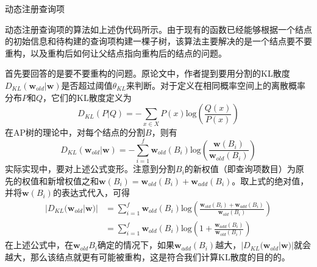 \documentclass[UTF8]{ctexart}
\begin{document}
\begin{spacing}{1.0}
\begin{algorithm}[H]
\caption{动态注册查询项}
\LinesNumbered
{}
\end{algorithm}
\end{spacing}

动态注册查询项的算法如上述伪代码所示。由于现有的函数已经能够根据一个结点的初始信息和待构建的查询项构建一棵子树，该算法主要解决的是一个结点要不要重构，以及重构后如何让父结点指向重构后的结点的问题。

首先要回答的是要不要重构的问题。原论文中，作者提到要用分割的KL散度$D_{KL}(\textbf{w}_{old}|\textbf{w})$是否超过阈值$\theta_{KL}$来判断。对于定义在相同概率空间上的离散概率分布$P$和$Q$，它们的KL散度定义为
\[D_{KL}(P|Q)=-\sum_{x\in X} P(x)\mathrm{log}(\frac{Q(x)}{P(x)})\]
在AP树的理论中，对每个结点的分割$B$，则有
\[D_{KL}(\textbf{w}_{old}|\textbf{w})=-\sum_{i=1}^f \textbf{w}_{old}(B_i) \mathrm{log}(\frac{\textbf{w}(B_i)}{\textbf{w}_{old}(B_i)})\]
实际实现中，要对上述公式变形。注意到分割$B_i$的新权值（即查询项数目）为原先的权值和新增权值之和$\textbf{w}(B_i)=\textbf{w}_{old}(B_i)+\textbf{w}_{add}(B_i)$。取上式的绝对值，并将$\textbf{w}(B_i)$的表达式代入，可得 
\[\begin{split}|D_{KL}(\textbf{w}_{old}|\textbf{w})| 
&= \sum_{i=1}^f \textbf{w}_{old}(B_i) \mathrm{log}(\frac{\textbf{w}_{old}(B_i) + \textbf{w}_{add}(B_i)}{\textbf{w}_{old}(B_i)}) \\
&= \sum_{i=1}^f \textbf{w}_{old}(B_i)\mathrm{log}(1 + \frac{\textbf{w}_{add}(B_i)}{\textbf{w}_{old}(B_i)}) \end{split}\] 
在上述公式中，在$\textbf{w}_{old}{B_i}$确定的情况下，如果$\textbf{w}_{add}(B_i)$越大，$|D_{KL}(\textbf{w}_{old}|\textbf{w})|$就会越大，那么该结点就更有可能被重构，这是符合我们计算KL散度的目的的。
\end{document}
